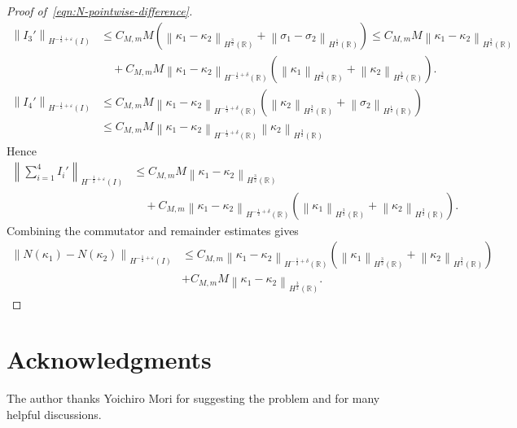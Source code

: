 \documentclass[11pt,reqno]{amsart}
\theoremstyle{plain}
\theoremstyle{definition}
\numberwithin{equation}{section}
\newcommand{\paren}[1]{\left(#1\right)}
\newcommand{\norm}[1]{\left\lVert #1 \right\rVert}
\newcommand{\R}{\mathbb{R}}
\newcommand{\hi}[1]{H^{#1}(I)}
\newcommand{\hr}[1]{H^{#1}(\R)}
\begin{document}
\begin{proof}[Proof of~\eqref{eqn:N-pointwise-difference}]
\begin{equation}
\begin{aligned}
    \norm{I_3'}_{\hi{-\frac{1}{2}+\varepsilon}} &\le C_{M,m}M \paren{\norm{\kappa_1-\kappa_2}_{\hr{\frac{3}{2}}}
    + \norm{\sigma_1-\sigma_2}_{\hr{\frac{1}{2}}}} \le C_{M,m}M \norm{\kappa_1-\kappa_2}_{\hr{\frac{3}{2}}} \\
    &\quad + C_{M,m}M \norm{\kappa_1-\kappa_2}_{\hr{-\frac{1}{2}+\delta}} \paren{
    \norm{\kappa_1}_{\hr{\frac{3}{2}}} +\norm{\kappa_2}_{\hr{\frac{3}{2}}} }.
\end{aligned}
\end{equation}
\begin{equation}
\begin{aligned}
    \norm{I_4'}_{\hi{-\frac{1}{2}+\varepsilon}} &\le C_{M,m}M \norm{\kappa_1-\kappa_2}_{\hr{-\frac{1}{2}+\delta}} \paren{\norm{\kappa_2}_{\hr{\frac{3}{2}}} + \norm{\sigma_2}_{\hr{\frac{1}{2}}}} \\
    &\le C_{M,m}M \norm{\kappa_1-\kappa_2}_{\hr{-\frac{1}{2}+\delta}} \norm{\kappa_2}_{\hr{\frac{3}{2}}}
\end{aligned}
\end{equation}
Hence
\begin{equation}
\begin{aligned}
    \norm{\sum_{i=1}^4 I_i'}_{\hi{-\frac{1}{2}+\varepsilon}}
    &\le C_{M,m}M
    \norm{\kappa_1-\kappa_2}_{\hr{\frac{3}{2}}} \\
    &\quad
    + C_{M,m}
    \norm{\kappa_1-\kappa_2}_{\hr{-\frac{1}{2}+\delta}}
    \paren{
        \norm{\kappa_1}_{\hr{\frac{3}{2}}}
        +\norm{\kappa_2}_{\hr{\frac{3}{2}}}
    }.
\end{aligned}
\end{equation}
Combining the commutator and remainder estimates gives
\begin{equation}
\begin{aligned}
    \norm{N(\kappa_1) - N(\kappa_2)}_{\hi{-\frac{1}{2}+\varepsilon}} &\le C_{M,m} \norm{\kappa_1-\kappa_2}_{\hr{-\frac{1}{2}+\delta}} \paren{\norm{\kappa_1}_{\hr{\frac{3}{2}}}+\norm{\kappa_2}_{\hr{\frac{3}{2}}}} \\
    & + C_{M,m}M \norm{\kappa_1-\kappa_2}_{\hr{\frac{3}{2}}}.
\end{aligned}
\end{equation}
\end{proof}


\section*{Acknowledgments}
The author thanks Yoichiro Mori for suggesting the problem and for many helpful discussions.



\end{document}
